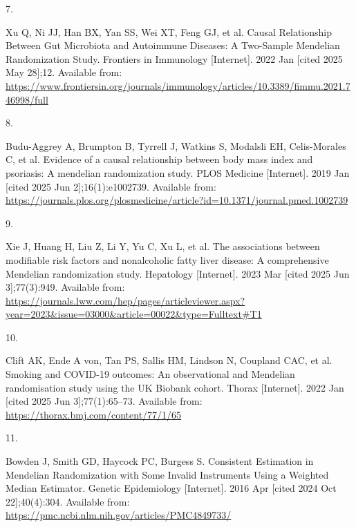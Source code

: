 \documentclass[
]{article}
\newlength{\cslhangindent}
\newlength{\csllabelwidth}
\newenvironment{CSLReferences}[2] %
 {\begin{list}{}{%
  \setlength{\itemindent}{0pt}
  \setlength{\leftmargin}{0pt}
  \setlength{\parsep}{0pt}
  \ifodd #1
   \setlength{\leftmargin}{\cslhangindent}
   \setlength{\itemindent}{-1\cslhangindent}
  \fi
  \setlength{\itemsep}{#2\baselineskip}}}
 {\end{list}}
\newcommand{\CSLLeftMargin}[1]{\parbox[t]{\csllabelwidth}{\strut#1\strut}}
\newcommand{\CSLRightInline}[1]{\parbox[t]{\linewidth - \csllabelwidth}{\strut#1\strut}}
\begin{document}
\begin{CSLReferences}{0}{1}
\CSLLeftMargin{7. }%
\CSLRightInline{Xu Q, Ni JJ, Han BX, Yan SS, Wei XT, Feng GJ, et al. Causal {Relationship} {Between} {Gut} {Microbiota} and {Autoimmune} {Diseases}: {A} {Two}-{Sample} {Mendelian} {Randomization} {Study}. Frontiers in Immunology {[}Internet{]}. 2022 Jan {[}cited 2025 May 28{]};12. Available from: \url{https://www.frontiersin.org/journals/immunology/articles/10.3389/fimmu.2021.746998/full}}

\CSLLeftMargin{8. }%
\CSLRightInline{Budu-Aggrey A, Brumpton B, Tyrrell J, Watkins S, Modalsli EH, Celis-Morales C, et al. Evidence of a causal relationship between body mass index and psoriasis: {A} mendelian randomization study. PLOS Medicine {[}Internet{]}. 2019 Jan {[}cited 2025 Jun 2{]};16(1):e1002739. Available from: \url{https://journals.plos.org/plosmedicine/article?id=10.1371/journal.pmed.1002739}}

\CSLLeftMargin{9. }%
\CSLRightInline{Xie J, Huang H, Liu Z, Li Y, Yu C, Xu L, et al. The associations between modifiable risk factors and nonalcoholic fatty liver disease: {A} comprehensive {Mendelian} randomization study. Hepatology {[}Internet{]}. 2023 Mar {[}cited 2025 Jun 3{]};77(3):949. Available from: \url{https://journals.lww.com/hep/pages/articleviewer.aspx?year=2023&issue=03000&article=00022&type=Fulltext\#T1}}

\CSLLeftMargin{10. }%
\CSLRightInline{Clift AK, Ende A von, Tan PS, Sallis HM, Lindson N, Coupland CAC, et al. Smoking and {COVID}-19 outcomes: An observational and {Mendelian} randomisation study using the {UK} {Biobank} cohort. Thorax {[}Internet{]}. 2022 Jan {[}cited 2025 Jun 3{]};77(1):65--73. Available from: \url{https://thorax.bmj.com/content/77/1/65}}

\CSLLeftMargin{11. }%
\CSLRightInline{Bowden J, Smith GD, Haycock PC, Burgess S. Consistent {Estimation} in {Mendelian} {Randomization} with {Some} {Invalid} {Instruments} {Using} a {Weighted} {Median} {Estimator}. Genetic Epidemiology {[}Internet{]}. 2016 Apr {[}cited 2024 Oct 22{]};40(4):304. Available from: \url{https://pmc.ncbi.nlm.nih.gov/articles/PMC4849733/}}

\end{CSLReferences}
\end{document}
